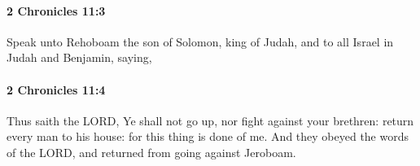 		\paragraph{2 Chronicles 11:3} %
			\label{2CHRONICLES-11-3}

			Speak unto Rehoboam the son of Solomon, king of Judah, and to all Israel in Judah and Benjamin, saying,


		\paragraph{2 Chronicles 11:4} %
			\label{2CHRONICLES-11-4}

			Thus saith the LORD, Ye shall not go up, nor fight against your brethren: return every man to his house: for this thing is done of me. And they obeyed the words of the LORD, and returned from going against Jeroboam.


